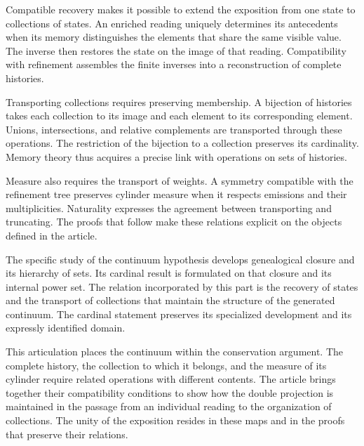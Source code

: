 
Compatible recovery makes it possible to extend the exposition from
one state to collections of states. An enriched reading uniquely
determines its antecedents when its memory distinguishes the
elements that share the same visible value. The inverse then
restores the state on the image of that reading. Compatibility
with refinement assembles the finite inverses into a reconstruction
of complete histories.

Transporting collections requires preserving membership. A bijection
of histories takes each collection to its image and each element to its
corresponding element. Unions, intersections, and relative complements
are transported through these operations. The restriction of the
bijection to a collection preserves its cardinality. Memory theory thus
acquires a precise link with operations on sets of histories.

Measure also requires the transport of weights. A symmetry compatible
with the refinement tree preserves cylinder measure when it respects
emissions and their multiplicities. Naturality expresses the
agreement between transporting and truncating. The proofs that
follow make these relations explicit on the objects defined in
the article.

The specific study of the continuum hypothesis develops genealogical
closure and its hierarchy of sets. Its cardinal result is formulated
on that closure and its internal power set. The relation incorporated
by this part is the recovery of states and the transport of collections
that maintain the structure of the generated continuum. The cardinal
statement preserves its specialized development and its expressly
identified domain.

This articulation places the continuum within the conservation
argument. The complete history, the collection to which it belongs,
and the measure of its cylinder require related operations with
different contents. The article brings together their compatibility
conditions to show how the double projection is maintained in the
passage from an individual reading to the organization of collections.
The unity of the exposition resides in these maps and in the proofs
that preserve their relations.
